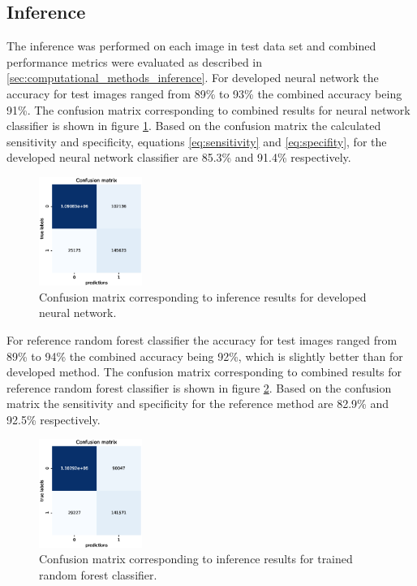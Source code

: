 \documentclass[aps,prb,10pt,twocolumn,groupedaddress]{revtex4-1}
\begin{document}
\subsection{Inference}
\label{sec:results_inference}
The inference was performed on each image in test data set and combined performance metrics were evaluated as described in \ref{sec:computational_methods_inference}. For developed neural network the accuracy for test images ranged from 89\% to 93\% the combined accuracy being 91\%. The confusion matrix corresponding to combined results for neural network classifier is shown in figure \ref{fig:confusion_matrix_nn}. Based on the confusion matrix the calculated sensitivity and specificity, equations \ref{eq:sensitivity} and \ref{eq:specifity}, for the developed neural network classifier are 85.3\% and 91.4\% respectively. 
\begin{figure}[!h]
	\centering
	\includegraphics[width=0.3\textwidth]{images/confusion_matrix_nn_total_accuracy_91.eps}
	\caption{Confusion matrix corresponding to inference results for developed neural network.}
	\label{fig:confusion_matrix_nn}
\end{figure}

For reference random forest classifier the accuracy for test images ranged from 89\% to 94\% the combined accuracy being 92\%,  which is slightly better than for developed method. The confusion matrix corresponding to combined results for reference random forest classifier is shown in figure \ref{fig:confusion_matrix_rf}. Based on the confusion matrix the sensitivity and specificity for the reference method are 82.9\% and 92.5\% respectively.
\begin{figure}[!h]
	\centering
	\includegraphics[width=0.3\textwidth]{images/confusion_matrix_rf_total_accuracy_92.eps}
	\caption{Confusion matrix corresponding to inference results for trained random forest classifier.}
	\label{fig:confusion_matrix_rf}
\end{figure}
\end{document}
